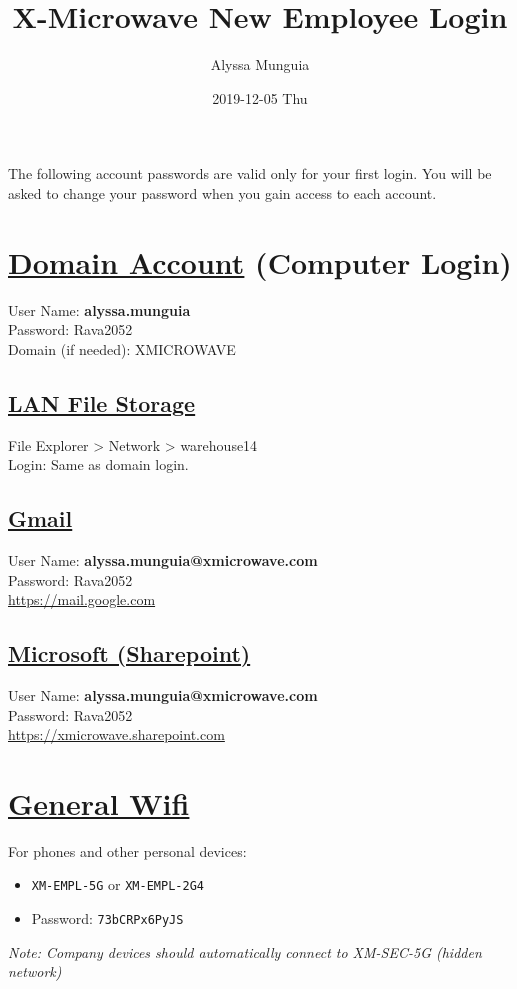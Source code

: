 \documentclass[11pt]{article}
\author{Alyssa Munguia}
\date{2019-12-05 Thu}
\title{X-Microwave New Employee Login}
\begin{document}
\maketitle
The following account passwords are valid only for your first login. You will be asked to change your password when you gain access to each account.
\section*{\underline{Domain Account} (Computer Login)}
\label{sec:org8d03fee}
User Name: \textbf{\MakeLowercase{Alyssa}.\MakeLowercase{Munguia}} \\
Password: Rava2052 \\
Domain (if needed): XMICROWAVE

\subsection*{\underline{LAN File Storage}}
\label{sec:org7f1b44c}
File Explorer > Network > warehouse14 \\
Login: Same as domain login.

\subsection*{\underline{Gmail}}
\label{sec:orgf76f8c4}
User Name: \textbf{\MakeLowercase{Alyssa}.\MakeLowercase{Munguia}@xmicrowave.com} \\
Password: Rava2052 \\
\url{https://mail.google.com}

\subsection*{\underline{Microsoft (Sharepoint)}}
\label{sec:org3aa8b13}
User Name: \textbf{\MakeLowercase{Alyssa}.\MakeLowercase{Munguia}@xmicrowave.com} \\
Password: Rava2052 \\
\url{https://xmicrowave.sharepoint.com}
\section*{\underline{General Wifi}}
\label{sec:org5904ab0}
For phones and other personal devices:
\begin{itemize}
\item \texttt{XM-EMPL-5G} or \texttt{XM-EMPL-2G4}
\item Password: \texttt{73bCRPx6PyJS}
\end{itemize}
\emph{Note: Company devices should automatically connect to XM-SEC-5G (hidden network)}
\end{document}
